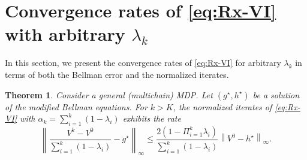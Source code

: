 \documentclass{article} %
\newcommand{\cP}{\mathcal{P}}
\newcommand*{\infn}[1]{\left\|{#1}\right\|_{\infty}}
\newtheorem{theorem}{Theorem}
\begin{document}

\vspace{0.1in}

\section{Convergence rates of \ref{eq:Rx-VI} with arbitrary $\lambda_k$}\label{s::omitted-KM-theorems}
In this section, we present the convergence rates of \ref{eq:Rx-VI} for arbitrary $\lambda_k$ in terms of both the Bellman error and the normalized iterates.
\begin{theorem}\label{thm::KM_normalized}
Consider a general (multichain) MDP.
Let $(g^{\star},h^{\star})$ be a solution of the modified Bellman equations.
For $k>K$, the normalized iterates of \ref{eq:Rx-VI} with $\alpha_k = \sum^{k}_{i=1} (1-\lambda_{i})$ exhibits the rate
   \[\infn{\frac{V^k-V^0}{\sum^{k}_{i=1} (1-\lambda_{i})}-g^{\star}} \le \frac{2(1-\Pi^{k}_{i=1}\lambda_{i})}{\sum^{k}_{i=1} (1-\lambda_{i})}\infn{V^0-h^{\star}}.\]
\end{theorem}

 
\end{document}
